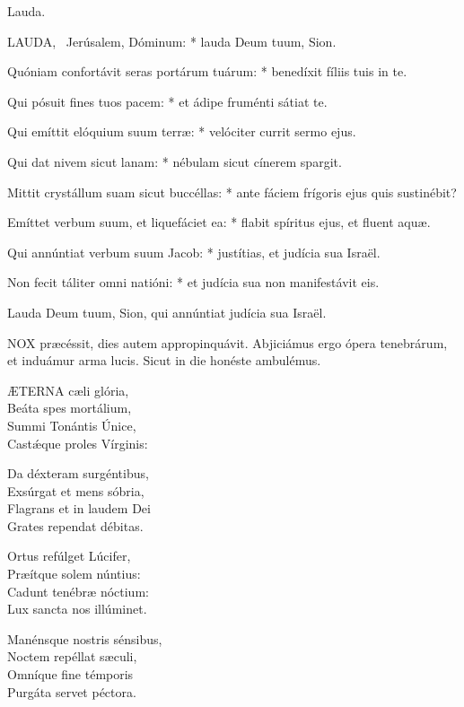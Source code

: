  Lauda. \textdagger


\lettrine[lines=2]{L}{AUDA}, \textdagger\ Jerúsalem, Dóminum: * lauda Deum tuum, Sion.

Quóniam confortávit seras portárum tuárum: * benedíxit fíliis tuis in te.

Qui pósuit fines tuos pacem: * et ádipe fruménti sátiat te.

Qui emíttit elóquium suum terræ: * velóciter currit sermo ejus.

Qui dat nivem sicut lanam: * nébulam sicut cínerem spargit.

Mittit crystállum suam sicut buccéllas: * ante fáciem frígoris ejus quis sustinébit?

Emíttet verbum suum, et liquefáciet ea: * flabit spíritus ejus, et fluent aquæ.

Qui annúntiat verbum suum Jacob: * justítias, et judícia sua Israël.

Non fecit táliter omni natióni: * et judícia sua non manifestávit eis.

 Lauda Deum tuum, Sion, qui annúntiat judícia sua Israël.


\lettrine[lines=2]{N}{OX} præcéssit, dies autem appropinquávit. Abjiciámus ergo ópera tenebrárum, et induámur arma lucis. Sicut in die honéste ambulémus.


\lettrine[lines=2]{Æ}{TERNA} cæli glória,\\
Beáta spes mortálium,\\
Summi Tonántis Únice,\\
Castǽque proles Vírginis:

Da déxteram surgéntibus,\\
Exsúrgat et mens sóbria,\\
Flagrans et in laudem Dei\\
Grates rependat débitas.

Ortus refúlget Lúcifer,\\
Præítque solem núntius:\\
Cadunt tenébræ nóctium:\\
Lux sancta nos illúminet.

Manénsque nostris sénsibus,\\
Noctem repéllat sæculi,\\
Omníque fine témporis\\
Purgáta servet péctora.

